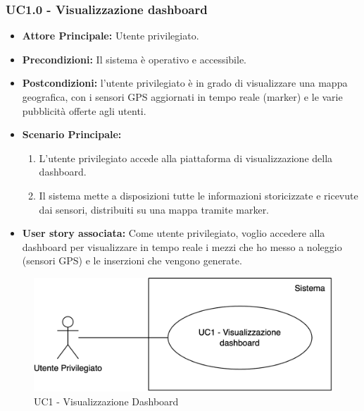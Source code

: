 \documentclass[11pt]{article}
\begin{document}
\begin{justify}
\subsubsection{\textbf{UC1.0 - Visualizzazione dashboard}}
\begin{itemize}
    \item \textbf{Attore Principale:} Utente privilegiato.
    \item \textbf{Precondizioni:} Il sistema è operativo e accessibile.
    \item \textbf{Postcondizioni:} l'utente privilegiato è in grado di visualizzare una mappa geografica, con i sensori GPS aggiornati in tempo reale (marker) e le varie pubblicità offerte agli utenti.
    \item \textbf{Scenario Principale:}
    \begin{enumerate}
        \item L'utente privilegiato accede alla piattaforma di visualizzazione della dashboard.
        \item Il sistema mette a disposizioni tutte le informazioni storicizzate e ricevute dai sensori, distribuiti su una mappa tramite marker.
    \end{enumerate}
    \item \textbf{User story associata:} Come utente privilegiato, voglio accedere alla dashboard per visualizzare in tempo reale i mezzi che ho messo a noleggio (sensori GPS) e le inserzioni che vengono generate.
    
\end{itemize}
\begin{figure}[ht]
    \centering
    \includegraphics[width=0.5\linewidth]{UC1image.png}
    \caption{UC1 - Visualizzazione Dashboard}
    \label{fig:UC1}
\end{figure}


\end{justify}
\end{document}

